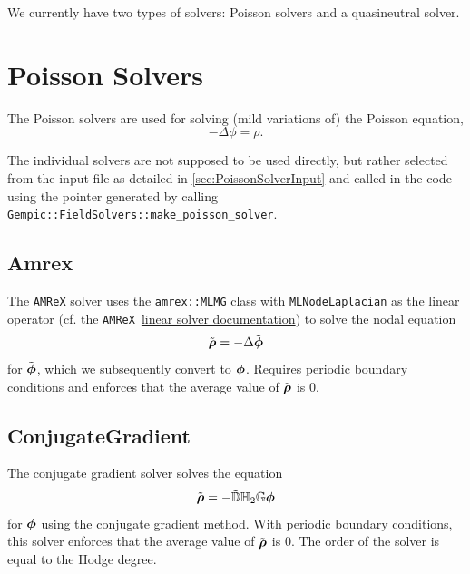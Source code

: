 \documentclass[11pt]{article}
\begin{document}
We currently have two types of solvers: Poisson solvers and a quasineutral solver.
\section{Poisson Solvers}
The Poisson solvers are used for solving (mild variations of) the Poisson equation,
\begin{equation}
    -\Delta\phi=\rho.
\end{equation}

The individual solvers are not supposed to be used directly, but rather selected from the input file as detailed in \ref{sec:PoissonSolverInput} and called in the code using the pointer generated by calling \lstinline{Gempic::FieldSolvers::make_poisson_solver}.

\subsection{Amrex}
The \lstinline{AMReX} solver uses the \lstinline{amrex::MLMG} class with \lstinline{MLNodeLaplacian} as the linear operator (cf. the \lstinline{AMReX}~\href{https://amrex-codes.github.io/amrex/docs_html/LinearSolvers.html}{linear solver documentation}) to solve the nodal equation
\begin{equation}
    {\tilde{\boldsymbol{\rm \mathsf{\rho}}}}=-\Delta{\tilde{\boldsymbol{\rm \mathsf{\phi}}}}
\end{equation}
for ${\tilde{\boldsymbol {\rm \mathsf{\phi}}}}$, which we subsequently convert to ${\boldsymbol {\rm \mathsf{\phi}}}$. Requires periodic boundary conditions and enforces that the average value of ${\tilde{\boldsymbol {\rm \mathsf{\rho}}}}$ is $0$.

\subsection{ConjugateGradient}
The conjugate gradient solver solves the equation 
\begin{equation}
    {\tilde{\boldsymbol{\rm \mathsf{\rho}}}}=-\tilde{\mathbb{D}}\mathbb{H}_2\mathbb{G}{\boldsymbol {\rm \mathsf{\phi}}}
\end{equation}
for ${\boldsymbol {\rm \mathsf{\phi}}}$ using the conjugate gradient method. With periodic boundary conditions, this solver enforces that the average value of ${\tilde{\boldsymbol {\rm \mathsf{\rho}}}}$ is $0$. The order of the solver is equal to the Hodge degree.
\end{document}
